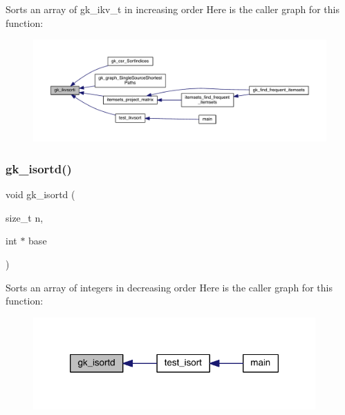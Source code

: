 Sorts an array of gk\+\_\+ikv\+\_\+t in increasing order Here is the caller graph for this function\+:\nopagebreak
\begin{figure}[H]
\begin{center}
\leavevmode
\includegraphics[width=350pt]{a00140_af0c57772aafc9ec6239683438641c08b_icgraph}
\end{center}
\end{figure}
\mbox{\label{a00140_a0d6536ac92fc1258c8386320dbda99ce}} 
\subsubsection{\texorpdfstring{gk\+\_\+isortd()}{gk\_isortd()}}
{\footnotesize\ttfamily void gk\+\_\+isortd (\begin{DoxyParamCaption}\item[{size\+\_\+t}]{n,  }\item[{int $\ast$}]{base }\end{DoxyParamCaption})}

Sorts an array of integers in decreasing order Here is the caller graph for this function\+:\nopagebreak
\begin{figure}[H]
\begin{center}
\leavevmode
\includegraphics[width=306pt]{a00140_a0d6536ac92fc1258c8386320dbda99ce_icgraph}
\end{center}
\end{figure}
\mbox{\label{a00140_ad434d886936ca951a6694a1d2037bbe3}} 
